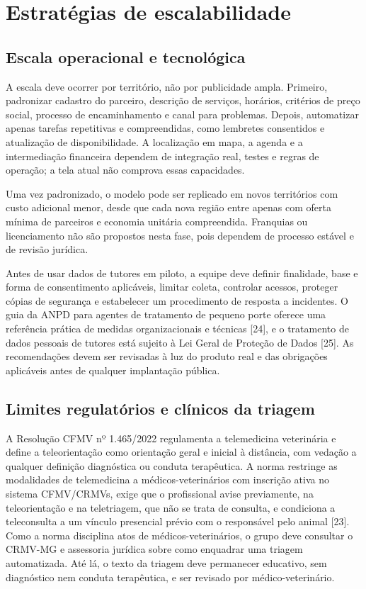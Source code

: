 \documentclass[12pt,a4paper]{article}
\begin{document}
\section{Estratégias de escalabilidade}

\subsection{Escala operacional e tecnológica}

A escala deve ocorrer por território, não por publicidade ampla. Primeiro, padronizar cadastro do parceiro, descrição de serviços, horários, critérios de preço social, processo de encaminhamento e canal para problemas. Depois, automatizar apenas tarefas repetitivas e compreendidas, como lembretes consentidos e atualização de disponibilidade. A localização em mapa, a agenda e a intermediação financeira dependem de integração real, testes e regras de operação; a tela atual não comprova essas capacidades.

Uma vez padronizado, o modelo pode ser replicado em novos territórios com custo adicional menor, desde que cada nova região entre apenas com oferta mínima de parceiros e economia unitária compreendida. Franquias ou licenciamento não são propostos nesta fase, pois dependem de processo estável e de revisão jurídica.

Antes de usar dados de tutores em piloto, a equipe deve definir finalidade, base e forma de consentimento aplicáveis, limitar coleta, controlar acessos, proteger cópias de segurança e estabelecer um procedimento de resposta a incidentes. O guia da ANPD para agentes de tratamento de pequeno porte oferece uma referência prática de medidas organizacionais e técnicas [24], e o tratamento de dados pessoais de tutores está sujeito à Lei Geral de Proteção de Dados [25]. As recomendações devem ser revisadas à luz do produto real e das obrigações aplicáveis antes de qualquer implantação pública.

\subsection{Limites regulatórios e clínicos da triagem}

A Resolução CFMV nº 1.465/2022 regulamenta a telemedicina veterinária e define a teleorientação como orientação geral e inicial à distância, com vedação a qualquer definição diagnóstica ou conduta terapêutica. A norma restringe as modalidades de telemedicina a médicos-veterinários com inscrição ativa no sistema CFMV/CRMVs, exige que o profissional avise previamente, na teleorientação e na teletriagem, que não se trata de consulta, e condiciona a teleconsulta a um vínculo presencial prévio com o responsável pelo animal [23]. Como a norma disciplina atos de médicos-veterinários, o grupo deve consultar o CRMV-MG e assessoria jurídica sobre como enquadrar uma triagem automatizada. Até lá, o texto da triagem deve permanecer educativo, sem diagnóstico nem conduta terapêutica, e ser revisado por médico-veterinário.
\end{document}
